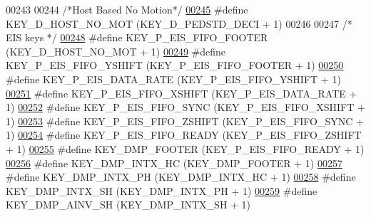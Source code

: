 \begin{DoxyCode}
00243 
00244 \textcolor{comment}{/*Host Based No Motion*/}
\hypertarget{dmp_key_8h_source.tex_l00245}{}\hyperlink{dmp_key_8h_a14af95d31024cc2ced44a85f8616a590}{00245} \textcolor{preprocessor}{#define KEY\_D\_HOST\_NO\_MOT           (KEY\_D\_PEDSTD\_DECI + 1)}
00246 
00247 \textcolor{comment}{/* EIS keys */}
\hypertarget{dmp_key_8h_source.tex_l00248}{}\hyperlink{dmp_key_8h_a5acc661ecde5155aa565ab5f632a8445}{00248} \textcolor{preprocessor}{#define KEY\_P\_EIS\_FIFO\_FOOTER       (KEY\_D\_HOST\_NO\_MOT + 1)}
\hypertarget{dmp_key_8h_source.tex_l00249}{}\hyperlink{dmp_key_8h_af09f81cf9cdfda4189808231387d1d8c}{00249} \textcolor{preprocessor}{#define KEY\_P\_EIS\_FIFO\_YSHIFT       (KEY\_P\_EIS\_FIFO\_FOOTER + 1)}
\hypertarget{dmp_key_8h_source.tex_l00250}{}\hyperlink{dmp_key_8h_a070a6ebc8d69e7419e3593b2416d6e97}{00250} \textcolor{preprocessor}{#define KEY\_P\_EIS\_DATA\_RATE         (KEY\_P\_EIS\_FIFO\_YSHIFT + 1)}
\hypertarget{dmp_key_8h_source.tex_l00251}{}\hyperlink{dmp_key_8h_a5a2c2fa3f0fce81a56cb446e370ba863}{00251} \textcolor{preprocessor}{#define KEY\_P\_EIS\_FIFO\_XSHIFT       (KEY\_P\_EIS\_DATA\_RATE + 1)}
\hypertarget{dmp_key_8h_source.tex_l00252}{}\hyperlink{dmp_key_8h_a95eb69c611571b0a2d04c480df10d32c}{00252} \textcolor{preprocessor}{#define KEY\_P\_EIS\_FIFO\_SYNC         (KEY\_P\_EIS\_FIFO\_XSHIFT + 1)}
\hypertarget{dmp_key_8h_source.tex_l00253}{}\hyperlink{dmp_key_8h_a10694004c2c3f6d4926ee14263ad8e3d}{00253} \textcolor{preprocessor}{#define KEY\_P\_EIS\_FIFO\_ZSHIFT       (KEY\_P\_EIS\_FIFO\_SYNC + 1)}
\hypertarget{dmp_key_8h_source.tex_l00254}{}\hyperlink{dmp_key_8h_abf1859a84ecc0d91d724b61dfb8cbb49}{00254} \textcolor{preprocessor}{#define KEY\_P\_EIS\_FIFO\_READY        (KEY\_P\_EIS\_FIFO\_ZSHIFT + 1)}
\hypertarget{dmp_key_8h_source.tex_l00255}{}\hyperlink{dmp_key_8h_aa757f17f6d6165f8e71fe472cfaf86cf}{00255} \textcolor{preprocessor}{#define KEY\_DMP\_FOOTER              (KEY\_P\_EIS\_FIFO\_READY + 1)}
\hypertarget{dmp_key_8h_source.tex_l00256}{}\hyperlink{dmp_key_8h_ad0519db3144da273560b198144f2422c}{00256} \textcolor{preprocessor}{#define KEY\_DMP\_INTX\_HC             (KEY\_DMP\_FOOTER + 1)}
\hypertarget{dmp_key_8h_source.tex_l00257}{}\hyperlink{dmp_key_8h_a9479ccc025c923d07f4854ea7348a706}{00257} \textcolor{preprocessor}{#define KEY\_DMP\_INTX\_PH             (KEY\_DMP\_INTX\_HC + 1)}
\hypertarget{dmp_key_8h_source.tex_l00258}{}\hyperlink{dmp_key_8h_a8dea641bae304fd2969dc1cda327b822}{00258} \textcolor{preprocessor}{#define KEY\_DMP\_INTX\_SH             (KEY\_DMP\_INTX\_PH + 1)}
\hypertarget{dmp_key_8h_source.tex_l00259}{}\hyperlink{dmp_key_8h_ab0149aeb858ec27aa149a76b56c403c2}{00259} \textcolor{preprocessor}{#define KEY\_DMP\_AINV\_SH             (KEY\_DMP\_INTX\_SH + 1)}

\end{DoxyCode}
